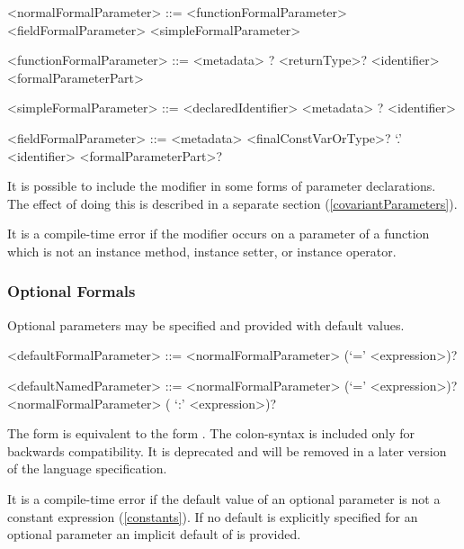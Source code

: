 \documentclass[makeidx]{article}
\begin{document}
\begin{grammar}
<normalFormalParameter> ::= <functionFormalParameter>
  \alt <fieldFormalParameter>
  \alt <simpleFormalParameter>

<functionFormalParameter> ::= \gnewline{}
  <metadata> \COVARIANT{}? <returnType>? <identifier> <formalParameterPart>

<simpleFormalParameter> ::= <declaredIdentifier>
  \alt <metadata> \COVARIANT{}? <identifier>

<fieldFormalParameter> ::= \gnewline{}
  <metadata> <finalConstVarOrType>? \THIS{} `.' <identifier> \gnewline{}
  <formalParameterPart>?
\end{grammar}

\LMHash{}%
It is possible to include the modifier \COVARIANT{}
in some forms of parameter declarations.
The effect of doing this is described in a separate section
(\ref{covariantParameters}).


\LMHash{}%
It is a compile-time error if the modifier \COVARIANT{} occurs on a parameter of a function which is not an instance method, instance setter, or instance operator.


\subsubsection{Optional Formals}

\LMHash{}%
Optional parameters may be specified and provided with default values.

\begin{grammar}
<defaultFormalParameter> ::= <normalFormalParameter> (`=' <expression>)?

<defaultNamedParameter> ::= <normalFormalParameter> (`=' <expression>)?
  \alt <normalFormalParameter> ( `:' <expression>)?
\end{grammar}

The form 
is equivalent to the form
.
The colon-syntax is included only for backwards compatibility.
It is deprecated and will be removed in a later version of the language specification.

\LMHash{}%
It is a compile-time error if the default value of an optional parameter is not a constant expression (\ref{constants}).
If no default is explicitly specified for an optional parameter an implicit default of \NULL{} is provided.
\end{document}
